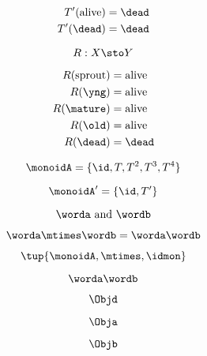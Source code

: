 {\begin{forslides}
		\begin{align*}
			T'(\text{alive}) & =  \dead \\
			T' (\dead)       & = \dead
		\end{align*}

		\begin{equation}
			R: X \sto Y
		\end{equation}

		\begin{align*}
			R(\text{sprout}) & = \text{alive}  \\
			R(\yng)          & =  \text{alive} \\
			R(\mature)       & = \text{alive}  \\
			R( \old)         & = \text{alive}  \\
			R (\dead)        & = \dead
		\end{align*}

		\begin{equation}
			\monoidA = \{ \id, T, T^2, T^3, T^4 \}
		\end{equation}

		\begin{equation}
			\monoidA' = \{ \id, T' \}
		\end{equation}

		\begin{equation*}
			\worda \text{ and } \wordb
		\end{equation*}

		\begin{equation*}
			\label{eq:string-semigroup-wordab-2}
			\worda \mtimes  \wordb =  \worda \wordb
		\end{equation*}

		\begin{equation}
			\tup{ \monoidA, \mtimes, \idmon}
		\end{equation}

		\begin{equation*}
			\label{eq:string-semigroup-wordab-concat-2}
			\worda \wordb
		\end{equation*}

		\begin{equation}
			\label{eq:00}
			\Objd
		\end{equation}

		\begin{equation}
			\label{eq:01}
			\Obja
		\end{equation}

		\begin{equation}
			\label{eq:02}
			\Objb
		\end{equation}


\end{forslides}}
